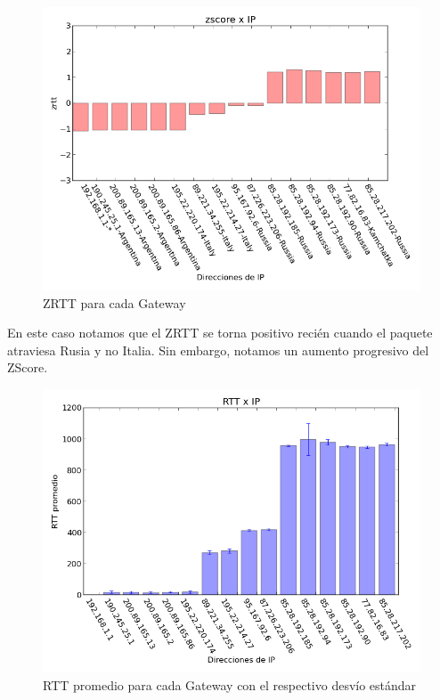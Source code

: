 \begin{figure}[H]
	\begin{center}
		  \includegraphics[scale=0.5]{../graficos_informe/kamgu_zscore.png}
		  \caption{ZRTT para cada Gateway}
		  \label{fig:contra1}
	\end{center}
\end{figure}

En este caso notamos que el ZRTT se torna positivo recién cuando el paquete atraviesa Rusia y no Italia. Sin embargo, notamos un aumento progresivo del ZScore.

\begin{figure}[H]
	\begin{center}
		  \includegraphics[scale=0.5]{../graficos_informe/kamgu_rtt.png}
		  \caption{RTT promedio para cada Gateway con el respectivo desvío estándar}
		  \label{fig:contra1}
	\end{center}
\end{figure}

